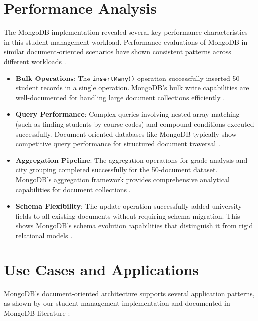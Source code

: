 \section{Performance Analysis}

The MongoDB implementation revealed several key performance characteristics in this student management workload. Performance evaluations of MongoDB in similar document-oriented scenarios have shown consistent patterns across different workloads \parencite{mongodb_performance_benchmarks}.

\begin{itemize}
    \item \textbf{Bulk Operations}: The \texttt{insertMany()} operation successfully inserted 50 student records in a single operation. MongoDB's bulk write capabilities are well-documented for handling large document collections efficiently \parencite{mongodb_architecture}.
    \item \textbf{Query Performance}: Complex queries involving nested array matching (such as finding students by course codes) and compound conditions executed successfully. Document-oriented databases like MongoDB typically show competitive query performance for structured document traversal \parencite{nosql_performance}.
    \item \textbf{Aggregation Pipeline}: The aggregation operations for grade analysis and city grouping completed successfully for the 50-document dataset. MongoDB's aggregation framework provides comprehensive analytical capabilities for document collections \parencite{mongodb_architecture}.
    \item \textbf{Schema Flexibility}: The update operation successfully added university fields to all existing documents without requiring schema migration. This shows MongoDB's schema evolution capabilities that distinguish it from rigid relational models \parencite{mongodb_definitive_guide}.
\end{itemize}

\section{Use Cases and Applications}

MongoDB's document-oriented architecture supports several application patterns, as shown by our student management implementation and documented in MongoDB literature \parencite{mongodb_definitive_guide}:

